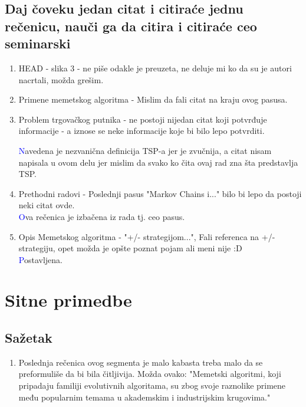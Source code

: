 \documentclass[a4paper]{report}
\newcommand{\odgovor}[1]{\textcolor{blue}{#1}}
\begin{document}
\subsection{Daj čoveku jedan citat i citiraće jednu rečenicu, nauči ga da citira i citiraće ceo seminarski}
\begin{enumerate}
  \item HEAD - slika 3 - ne piše odakle je preuzeta, ne deluje mi ko da su je autori nacrtali, možda grešim.
  \item Primene memetskog algoritma - Mislim da fali citat na kraju ovog pasusa.
  \item Problem trgovačkog putnika - ne postoji nijedan citat koji potvrđuje informacije - a iznose se neke informacije koje bi bilo lepo potvrditi.
  
  \odgovor Navedena je nezvanična definicija TSP-a jer je zvučnija, a citat nisam napisala u ovom delu jer mislim da svako ko čita ovaj rad zna šta predstavlja TSP. 
  \item Prethodni radovi - Poslednji pasus "Markov Chains i..."  bilo bi lepo da postoji neki citat ovde. \\
    \odgovor Ova rečenica je izbačena iz rada tj. ceo pasus.
  
  \item Opis Memetskog algoritma - "+/- strategijom...", Fali referenca na +/- strategiju, opet možda je opšte poznat pojam ali meni nije :D \\
  \odgovor Postavljena. \\
  
\end{enumerate}

\section{Sitne primedbe}

\subsection{Sažetak}
\begin{enumerate}
  \item Poslednja rečenica ovog segmenta je malo kabasta treba malo da se preformuliše da bi bila čitljivija. Možda ovako: "Memetski algoritmi, koji pripadaju familiji evolutivnih algoritama, su zbog svoje raznolike primene među popularnim temama u akademskim i industrijskim krugovima."
\end{enumerate}
\end{document}
